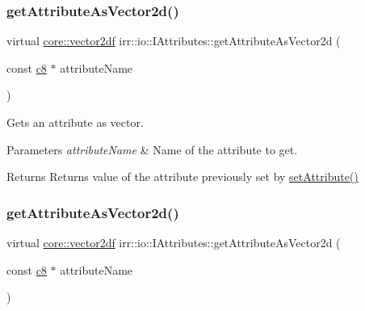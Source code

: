 \subsubsection{\texorpdfstring{get\+Attribute\+As\+Vector2d()}{getAttributeAsVector2d()}\hspace{0.1cm}{\footnotesize\ttfamily [1/4]}}
{\footnotesize\ttfamily virtual \hyperlink{namespaceirr_1_1core_a116f90bd31515724b6235014ee2b74d5}{core\+::vector2df} irr\+::io\+::\+I\+Attributes\+::get\+Attribute\+As\+Vector2d (\begin{DoxyParamCaption}\item[{const \hyperlink{namespaceirr_a9395eaea339bcb546b319e9c96bf7410}{c8} $\ast$}]{attribute\+Name }\end{DoxyParamCaption})\hspace{0.3cm}{\ttfamily [pure virtual]}}



Gets an attribute as vector. 


\begin{DoxyParams}{Parameters}
{\em attribute\+Name} & Name of the attribute to get. \\
\hline
\end{DoxyParams}
\begin{DoxyReturn}{Returns}
Returns value of the attribute previously set by \hyperlink{classirr_1_1io_1_1IAttributes_a03fa31acb481ae23678676cc183f09a6}{set\+Attribute()} 
\end{DoxyReturn}
\mbox{\label{classirr_1_1io_1_1IAttributes_a047461734c2eb9e3f1b68a4278a0d24b}} 
\subsubsection{\texorpdfstring{get\+Attribute\+As\+Vector2d()}{getAttributeAsVector2d()}\hspace{0.1cm}{\footnotesize\ttfamily [2/4]}}
{\footnotesize\ttfamily virtual \hyperlink{namespaceirr_1_1core_a116f90bd31515724b6235014ee2b74d5}{core\+::vector2df} irr\+::io\+::\+I\+Attributes\+::get\+Attribute\+As\+Vector2d (\begin{DoxyParamCaption}\item[{const \hyperlink{namespaceirr_a9395eaea339bcb546b319e9c96bf7410}{c8} $\ast$}]{attribute\+Name }\end{DoxyParamCaption})\hspace{0.3cm}{\ttfamily [pure virtual]}}



